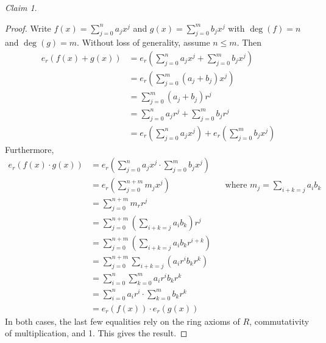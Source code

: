 \documentclass[12pt,letterpaper,DIV=11,final]{scrartcl}
\theoremstyle{plain}
\theoremstyle{definition}
\theoremstyle{remark}
\newtheorem{claim}{Claim}
\begin{document}
\begin{claim}
  \begin{proof}
    Write $f(x) = \sum_{j = 0}^n a_j x^j$ and $g(x) = \sum_{j = 0}^m b_j x^j$ with $\deg(f) = n$ and $\deg(g) = m$.
    Without loss of generality, assume $n \leq m$.
    Then
    \begin{align*}
      e_r(f(x) + g(x)) &= e_r \left( \sum_{j = 0}^n a_j x^j + \sum_{j = 0}^m b_j x^j \right) \\
                       &= e_r \left( \sum_{j = 0}^m \left( a_j + b_j \right) x^j \right) \\
                       &= \sum_{j = 0}^m \left( a_j + b_j \right) r^j \\
                       &= \sum_{j = 0}^n a_j r^j + \sum_{j = 0}^m b_j r^j \\
                       &= e_r \left( \sum_{j = 0}^n a_j x^j \right) + e_r \left( \sum_{j = 0}^m b_j x^j \right)
    \end{align*}
    Furthermore,
    \begin{align*}
      e_r(f(x) \cdot g(x)) &= e_r \left( \sum_{j = 0}^n a_j x^j \cdot \sum_{j = 0}^m b_j x^j \right) \\
                           &= e_r \left( \sum_{j = 0}^{n + m} m_j x^j \right) && \text{where $m_j = \sum_{i + k = j} a_i b_k$} \\
                           &= \sum_{j = 0}^{n + m} m_r r^j \\
                           &= \sum_{j = 0}^{n + m} \left( \sum_{i + k = j} a_i b_k \right) r^j \\
                           &= \sum_{j = 0}^{n + m} \left( \sum_{i + k = j} a_i b_k r^{i + k} \right) \\
                           &= \sum_{j = 0}^{n + m} \sum_{i + k = j} \left( a_i r^i b_k r^k \right) \\
                           &= \sum_{i = 0}^n \sum_{k = 0}^m a_i r^i b_k r^k \\
                           &= \sum_{i = 0}^n a_i r^i \cdot \sum_{k = 0}^m b_k r^k \\
                           &= e_r(f(x)) \cdot e_r(g(x))
    \end{align*}
    In both cases, the last few equalities rely on the ring axioms of $R$, commutativity of multiplication, and 1.
    This gives the result.
  \end{proof}
\end{claim}
\end{document}
